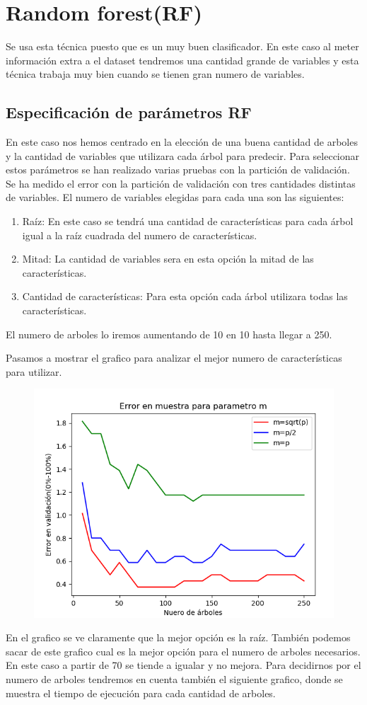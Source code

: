 \documentclass[titlepage]{article}
\begin{document}
	

	\section{Random forest(RF)}	
	Se usa esta técnica puesto que es un muy buen clasificador. En este caso al meter información extra a el dataset tendremos una cantidad grande de variables y esta técnica trabaja muy bien cuando se tienen gran numero de variables.
	\subsection{Especificación de parámetros RF} 
	En este caso nos hemos centrado en la elección de una buena cantidad de arboles y la cantidad de variables que utilizara cada árbol para predecir. Para seleccionar estos parámetros se han realizado varias pruebas con la partición de validación. Se ha medido el error con la partición de validación con tres cantidades distintas de variables. El numero de variables elegidas para cada una son las siguientes:
	\begin{enumerate}
		\item Raíz: En este caso se tendrá una cantidad de características para cada árbol igual a la raíz cuadrada del numero de características. 
		\item Mitad: La cantidad de variables sera en esta opción la mitad de las características.
		\item Cantidad de características: Para esta opción cada árbol utilizara todas las características.
	\end{enumerate}

	El numero de arboles lo iremos aumentando de 10 en 10 hasta llegar a 250. 
	
	Pasamos a mostrar el grafico para analizar el mejor numero de características para utilizar.
	\begin{figure}[H]
		\centering
		\includegraphics[width=0.7\linewidth]{../imagenesRF/errorvalidacion}
		\caption{}
		\label{fig:Cantidad de variables RF}
	\end{figure}
	En el grafico se ve claramente que la mejor opción es la raíz. También podemos sacar de este grafico cual es la mejor opción para el numero de arboles necesarios. En este caso a partir de 70 se tiende a igualar y no mejora. Para decidirnos por el numero de arboles tendremos en cuenta también el siguiente grafico, donde se muestra el tiempo de ejecución para cada cantidad de arboles.
	
\end{document}
